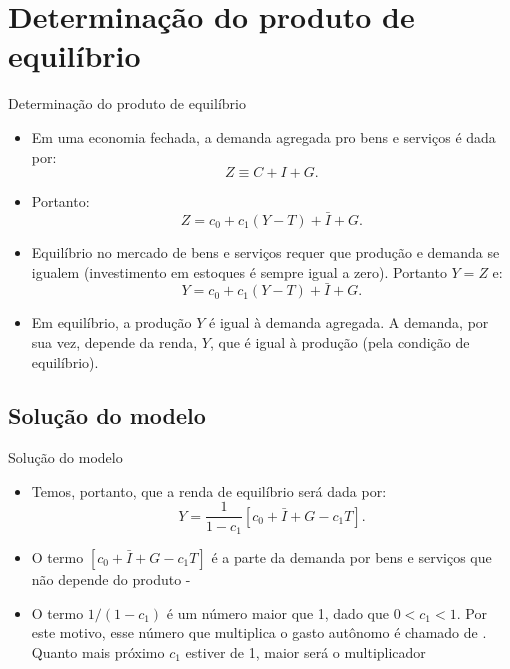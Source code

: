 \documentclass[10pt]{beamer}
\begin{document}
\section{Determinação do produto de equilíbrio}
\begin{frame}{Determinação do produto de equilíbrio}
    \begin{itemize}
        \item Em uma economia fechada, a demanda agregada pro bens e serviços é dada por:
        \[
        Z \equiv C + I + G.
        \]
         
        \item Portanto:
        \begin{equation}
            Z = c_0 + c_1(Y-T) + \bar{I} + G.
        \end{equation}
         
        \item Equilíbrio no mercado de bens e serviços requer que produção e demanda se igualem (investimento em estoques é sempre igual a zero). Portanto $Y = Z$ e:
        \begin{equation}
            Y = c_0 + c_1(Y-T) + \bar{I} + G.
        \end{equation}
         
        \item Em equilíbrio, a produção $Y$ é igual à demanda agregada. A demanda, por sua vez, depende da renda, $Y$, que é igual à produção (pela condição de equilíbrio).
    \end{itemize}
\end{frame}

\subsection{Solução do modelo}
\begin{frame}{Solução do modelo}
    \begin{itemize}
        \item Temos, portanto, que a renda de equilíbrio será dada por:
        \begin{equation}
            Y = \frac{1}{1-c_1}[c_0 + \bar{I} + G - c_1T].
        \end{equation}
         
        \item O termo $[c_0 + \bar{I} + G - c_1T]$ é a parte da demanda por bens e serviços que não depende do produto - \bigskip
         
        \item O termo $1/(1-c_1)$ é um número maior que 1, dado que $0<c_1<1$. Por este motivo, esse número que multiplica o gasto autônomo é chamado de . Quanto mais próximo $c_1$ estiver de 1, maior será o multiplicador
    \end{itemize}
\end{frame}
\end{document}
